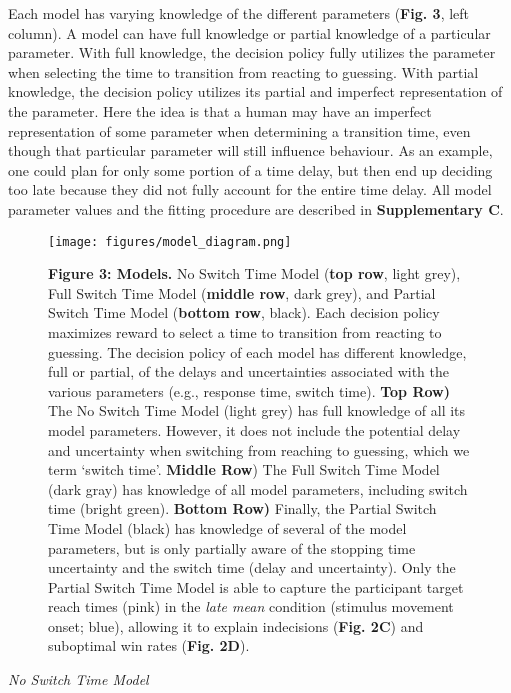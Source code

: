 \documentclass[man,donotrepeattitle,floatsintext,letterpaper,12pt]{apa7}
\newcommand\boldblue[1]{\textcolor{mydarkblue}{\textbf{#1}}}
\begin{document}
Each model has varying knowledge of the different parameters (\boldblue{Fig. 3}, left column). A model can have full knowledge or partial knowledge of a particular parameter. With full knowledge, the decision policy fully utilizes the parameter when selecting the time to transition from reacting to guessing. With partial knowledge, the decision policy utilizes its partial and imperfect representation of the parameter. Here the idea is that a human may have an imperfect representation of some parameter when determining a transition time, even though that particular parameter will still influence behaviour. As an example, one could plan for only some portion of a time delay, but then end up deciding too late because they did not fully account for the entire time delay. All model parameter values and the fitting procedure are described in \boldblue{Supplementary C}. 

\begin{figure}[H]
  \centering
  \texttt{[image: figures/model\_diagram.png]}

  \caption*{%
    \boldblue{Figure 3: Models.} No Switch Time Model (\boldblue{top row}, light grey), Full Switch Time Model (\boldblue{middle row}, dark grey), and Partial Switch Time Model (\boldblue{bottom row}, black). Each decision policy maximizes reward to select a time to transition from reacting to guessing. The decision policy of each model has different knowledge, full or partial, of the delays and uncertainties associated with the various parameters (e.g., response time, switch time). \boldblue{Top Row)} The No Switch Time Model (light grey) has full knowledge of all its model parameters. However, it does not include the potential delay and uncertainty when switching from reaching to guessing, which we term ‘switch time’.  \boldblue{Middle Row}) The Full Switch Time Model (dark gray) has knowledge of all model parameters, including switch time (bright green). \boldblue{Bottom Row)} Finally, the Partial Switch Time Model (black) has knowledge of several of the model parameters, but is only partially aware of the stopping time uncertainty and the switch time (delay and uncertainty). Only the Partial Switch Time Model is able to capture the participant target reach times (pink) in the \emph{late mean} condition (stimulus movement onset; blue), allowing it to explain indecisions (\boldblue{Fig. 2C}) and suboptimal win rates (\boldblue{Fig. 2D}).
    }
\end{figure}

\noindent\emph{{No Switch Time Model}}
\end{document}
